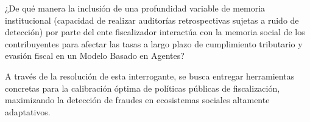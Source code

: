 \documentclass[twocolumn,10pt,letterpaper]{article}
\begin{document}
¿De qué manera la inclusión de una profundidad variable de memoria institucional (capacidad de realizar auditorías retrospectivas sujetas a ruido de detección) por parte del ente fiscalizador interactúa con la memoria social de los contribuyentes para afectar las tasas a largo plazo de cumplimiento tributario y evasión fiscal en un Modelo Basado en Agentes?

A través de la resolución de esta interrogante, se busca entregar herramientas concretas para la calibración óptima de políticas públicas de fiscalización, maximizando la detección de fraudes en ecosistemas sociales altamente adaptativos.

\printbibliography
\end{document}
